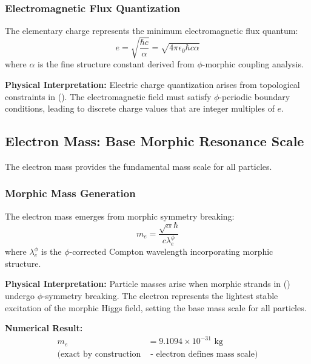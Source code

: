 \subsubsection{Electromagnetic Flux Quantization}

\begin{theorem}
The elementary charge represents the minimum electromagnetic flux quantum:
\begin{equation}
e = \sqrt{\frac{\hbar c}{\alpha}} = \sqrt{4\pi \epsilon_0 \hbar c \alpha}
\end{equation}
where $\alpha$ is the fine structure constant derived from $\phi$-morphic coupling analysis.
\end{theorem}

\textbf{Physical Interpretation:}
Electric charge quantization arises from topological constraints in (). The electromagnetic field must satisfy $\phi$-periodic boundary conditions, leading to discrete charge values that are integer multiples of $e$.

\subsection{Electron Mass: Base Morphic Resonance Scale}

The electron mass provides the fundamental mass scale for all particles.

\subsubsection{Morphic Mass Generation}

\begin{theorem}
The electron mass emerges from morphic symmetry breaking:
\begin{equation}
m_e = \frac{\sqrt{\alpha} \hbar}{c \lambda_e^\phi}
\end{equation}
where $\lambda_e^\phi$ is the $\phi$-corrected Compton wavelength incorporating morphic structure.
\end{theorem}

\textbf{Physical Interpretation:}
Particle masses arise when morphic strands in () undergo $\phi$-symmetry breaking. The electron represents the lightest stable excitation of the morphic Higgs field, setting the base mass scale for all particles.

\textbf{Numerical Result:}
\begin{align}
m_e &= 9.1094 \times 10^{-31} \text{ kg}\\
\text{(exact by construction} &\text{ - electron defines mass scale)}
\end{align}

